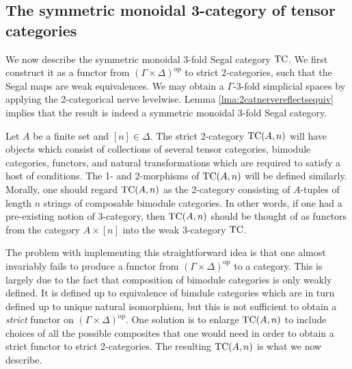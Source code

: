 \documentclass{amsart}
\begin{document}




\subsection{The symmetric monoidal 3-category of tensor categories} \label{sec-tc-threecat}


We now describe the symmetric monoidal 3-fold Segal category $\mathrm{TC}$. We first construct it as a functor from $(\Gamma \times \Delta)^\textrm{op}$ to strict 2-categories, such that the Segal maps are weak equivalences. We may obtain a $\Gamma$-3-fold simplicial spaces by applying the 2-categorical nerve levelwise. Lemma \ref{lma:2catnervereflectsequiv} implies that the result is indeed a symmetric monoidal 3-fold Segal category. 

Let $A$ be a finite set and $[n]\in \Delta$. The strict 2-category $\mathrm{TC}(A,n)$ will have objects which consist of collections of several tensor categories, bimodule categories, functors, and natural transformations which are required to satisfy a host of conditions. The 1- and 2-morphisms of $\mathrm{TC}(A,n)$ will be defined similarly. Morally, one should regard $\mathrm{TC}(A,n)$ as the 2-category consisting of $A$-tuples of length $n$ strings of composable bimodule categories. In other words, if one had a pre-existing notion of 3-category, then $\mathrm{TC}(A,n)$ should be thought of as functors from the category $A \times [n]$ into the weak 3-category $\mathrm{TC}$. 

The problem with implementing this straightforward idea is that one almost invariably fails to produce a functor from $(\Gamma \times \Delta)^\textrm{op}$ to a category. This is largely due to the fact that  composition of bimodule categories is only weakly defined. It is defined up to equivalence of bimdule categories which are in turn defined up to unique natural isomorphism, but this is not sufficient to obtain a {\em strict} functor on $(\Gamma \times \Delta)^\textrm{op}$. One solution is to enlarge $\mathrm{TC}(A,n)$ to include choices of all the possible composites that one would need in order to obtain a strict functor to strict 2-categories. The resulting $\mathrm{TC}(A,n)$ is what we now describe.
\end{document}
